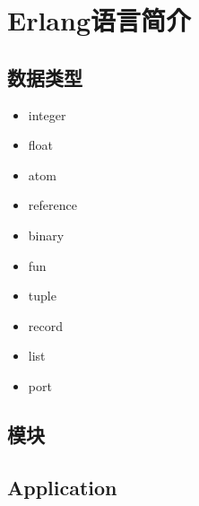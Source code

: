 \chapter{Erlang语言简介}

\section{数据类型}
\begin{itemize}
  \item integer
  \item float
  \item atom
  \item reference
  \item binary
  \item fun
  \item tuple
  \item record
  \item list
  \item port
\end{itemize}

\section{模块}
\section{Application}

